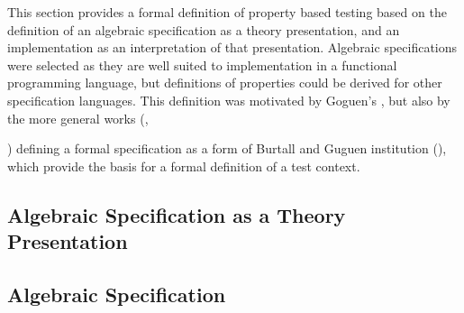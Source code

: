 
This section provides a formal definition of property based testing
based on the definition of an algebraic specification as a theory presentation,
and an implementation as an interpretation of that presentation.
Algebraic specifications were selected as they are well suited to 
implementation in a functional programming language,
but definitions of properties could be derived for other specification languages.
This definition was motivated by Goguen's \cite{GoguenIBM1977},
but also by the more general works (\cite{BernotGaudelMarre1991}, { \cite{Bernot1991})
defining a formal specification as a form of Burtall and Guguen institution (\cite{BurstallGoguen1977}),
which provide the basis for a formal definition of a test context.

\subsection{Algebraic Specification as a Theory Presentation}\label{formal_spec}



\subsection{Algebraic Specification}

}
